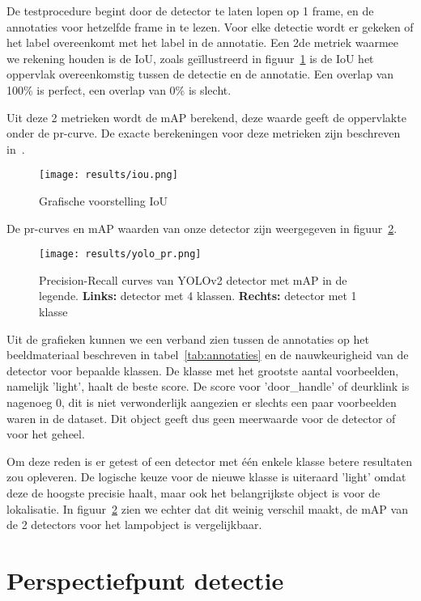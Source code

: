 De testprocedure begint door de detector te laten lopen op 1 frame, en de annotaties voor hetzelfde frame in te lezen.
Voor elke detectie wordt er gekeken of het label overeenkomt met het label in de annotatie.
Een 2de metriek waarmee we rekening houden is de \gls{IoU}, zoals ge\"{i}llustreerd in figuur~\ref{fig:iou} is de \gls{IoU}
het oppervlak overeenkomstig tussen de detectie en de annotatie.
Een overlap van 100\% is perfect, een overlap van 0\% is slecht.

Uit deze 2 metrieken wordt de \gls{mAP} berekend, deze waarde geeft de oppervlakte onder de pr-curve.
De exacte berekeningen voor deze metrieken zijn beschreven in~\cite{everingham2010pascal}.

\begin{figure}[h]
    \centering
    \texttt{[image: results/iou.png]}
    \caption{Grafische voorstelling IoU}
    \label{fig:iou}
\end{figure}

De pr-curves en \gls{mAP} waarden van onze detector zijn weergegeven in figuur~\ref{fig:yolo_pr}.

\begin{figure}[h]
    \texttt{[image: results/yolo\_pr.png]}
    \caption{Precision-Recall curves van YOLOv2 detector met mAP in de legende. \textbf{Links:} detector met 4 klassen. \textbf{Rechts:} detector met 1 klasse}
    \label{fig:yolo_pr}
\end{figure}

Uit de grafieken kunnen we een verband zien tussen de annotaties op het beeldmateriaal beschreven in tabel~\ref{tab:annotaties} en de nauwkeurigheid van
de detector voor bepaalde klassen. De klasse met het grootste aantal voorbeelden, namelijk 'light', haalt de beste score.
De score voor 'door\_handle' of deurklink is nagenoeg 0, dit is niet verwonderlijk aangezien er slechts een paar voorbeelden waren in de dataset.
Dit object geeft dus geen meerwaarde voor de detector of voor het geheel.

Om deze reden is er getest of een detector met \'{e}\'{e}n enkele klasse betere resultaten zou opleveren.
De logische keuze voor de nieuwe klasse is uiteraard 'light' omdat deze de hoogste precisie haalt, maar ook het belangrijkste object is voor de lokalisatie.
In figuur~\ref{fig:yolo_pr} zien we echter dat dit weinig verschil maakt, de \gls{mAP} van de 2 detectors voor het lampobject is vergelijkbaar.

\section{Perspectiefpunt detectie}

